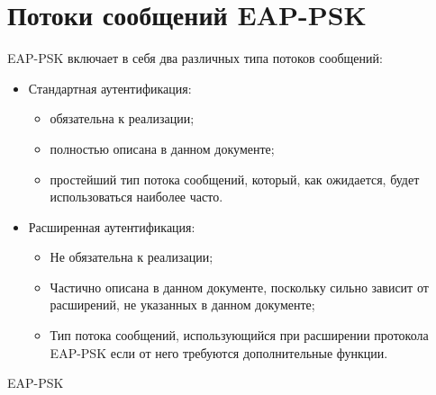 \newpage
\section{Потоки сообщений EAP-PSK}

EAP-PSK включает в себя два различных типа потоков сообщений:

\begin{itemize}
\item Стандартная аутентификация:
\begin{itemize}
\item обязательна к реализации;
\item полностью описана в данном документе;
\item простейший тип потока сообщений, который, как ожидается, будет использоваться наиболее часто.
\end{itemize}
\item Расширенная аутентификация:
\begin{itemize}
\item Не обязательна к реализации;
\item Частично описана в данном документе, поскольку сильно зависит от расширений, не указанных в данном документе;
\item Тип потока сообщений, использующийся при расширении протокола EAP-PSK если от него требуются дополнительные функции.
\end{itemize}
\end{itemize}

EAP-PSK
